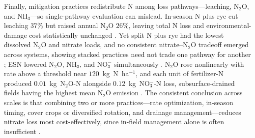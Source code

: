 \documentclass[11pt]{article}
\begin{document}
Finally, mitigation practices redistribute N among loss pathways---leaching,
N$_2$O, and NH$_3$---so single-pathway evaluation can mislead. In-season N plus
rye cut leaching $37\%$ but raised annual N$_2$O $26\%$, leaving total N loss
and environmental-damage cost statistically unchanged \parencite{PrezaFontes2023}.
Yet split N plus rye had the lowest dissolved N$_2$O and nitrate loads, and no
consistent nitrate--N$_2$O tradeoff emerged across systems, showing stacked
practices need not trade one pathway for another
\parencite{Oliveira2025,OBrien2022}; ESN lowered N$_2$O, NH$_3$, and NO$_3^-$
simultaneously \parencite{Menegaz2025}. N$_2$O rose nonlinearly with rate above
a threshold near $120$~kg~N~ha$^{-1}$, and each unit of fertilizer-N produced
$0.01$~kg~N$_2$O-N alongside $0.12$~kg~NO$_3^-$-N loss, subsurface-drained
fields having the highest mean N$_2$O emission
\parencite{Wang2016b,Chatterjee2020b,Fontes2019}. The consistent conclusion
across scales is that combining two or more practices---rate optimization,
in-season timing, cover crops or diversified rotation, and drainage
management---reduces nitrate loss most cost-effectively, since in-field
management alone is often insufficient \parencite{Dinnes2002,Singh2023}.

\printbibliography
\end{document}
